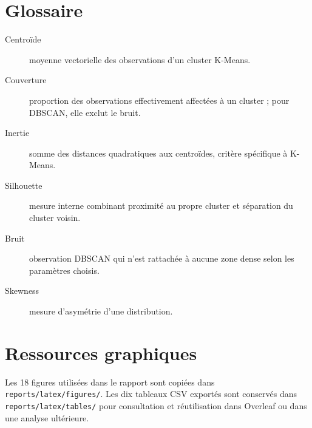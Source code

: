 \section{Glossaire}
\begin{description}
\item[Centroïde] moyenne vectorielle des observations d'un cluster K-Means.
\item[Couverture] proportion des observations effectivement affectées à un cluster ; pour DBSCAN, elle exclut le bruit.
\item[Inertie] somme des distances quadratiques aux centroïdes, critère spécifique à K-Means.
\item[Silhouette] mesure interne combinant proximité au propre cluster et séparation du cluster voisin.
\item[Bruit] observation DBSCAN qui n'est rattachée à aucune zone dense selon les paramètres choisis.
\item[Skewness] mesure d'asymétrie d'une distribution.
\end{description}

\section{Ressources graphiques}
Les 18 figures utilisées dans le rapport sont copiées dans \texttt{reports/latex/figures/}. Les dix tableaux CSV exportés sont conservés dans \texttt{reports/latex/tables/} pour consultation et réutilisation dans Overleaf ou dans une analyse ultérieure.
